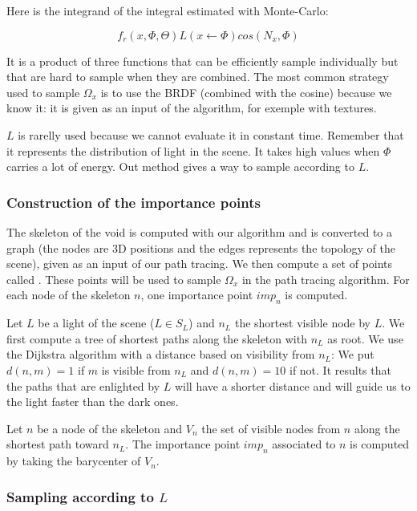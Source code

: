 Here is the integrand of the integral estimated with Monte-Carlo:

\begin{equation*}
f_r(x, \Phi, \Theta) L(x \leftarrow \Phi) cos(N_x, \Phi)
\end{equation*}

It is a product of three functions that can be efficiently sample individually but that are hard to sample when they are combined. The most common strategy used to sample $\Omega_x$ is to use the BRDF (combined with the cosine) because we know it: it is given as an input of the algorithm, for exemple with textures.

$L$ is rarelly used because we cannot evaluate it in constant time. Remember that it represents the distribution of light in the scene. It takes high values when $\Phi$ carries a lot of energy. Out method gives a way to sample according to $L$.

\subsubsection{Construction of the importance points}

The skeleton of the void is computed with our algorithm and is converted to a graph (the nodes are 3D positions and the edges represents the topology of the scene), given as an input of our path tracing. We then compute a set of points called . These points will be used to sample $\Omega_x$ in the path tracing algorithm. For each node of the skeleton $n$, one importance point $imp_n$ is computed.

Let $L$ be a light of the scene ($L \in S_L$) and $n_L$ the shortest visible node by $L$. We first compute a tree of shortest paths along the skeleton with $n_L$ as root. We use the Dijkstra algorithm with a distance based on visibility from $n_L$: We put $d(n, m) = 1$ if $m$ is visible from $n_L$ and $d(n, m) = 10$ if not. It results that the paths that are enlighted by $L$ will have a shorter distance and will guide us to the light faster than the dark ones.

Let $n$ be a node of the skeleton and $V_n$ the set of visible nodes from $n$ along the shortest path toward $n_L$. The importance point $imp_n$ associated to $n$ is computed by taking the barycenter of $V_n$.

\subsubsection{Sampling according to $L$}

